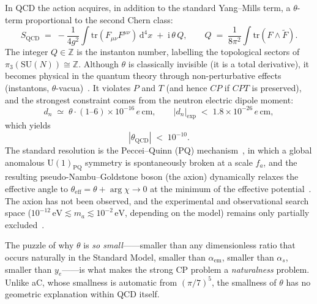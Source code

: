 \documentclass[11pt,a4paper]{article}
\newcommand{\aC}{a\text{-}C}
\newcommand{\SU}{\mathrm{SU}}
\providecommand{\dd}{}
\renewcommand{\dd}{\mathrm{d}}
\providecommand{\ii}{}
\renewcommand{\ii}{\mathrm{i}}
\renewcommand{\tr}{\mathrm{tr}}
\theoremstyle{plain}
\theoremstyle{definition}
\theoremstyle{remark}
\begin{document}
In QCD the action acquires, in addition to the standard Yang--Mills term,
a $\theta$-term proportional to the second Chern class:
\begin{equation}
  S_{\mathrm{QCD}} \;=\; -\frac{1}{4g^2}\int\tr(F_{\mu\nu}F^{\mu\nu})\,\dd^4 x
  \;+\; \ii\,\theta\,Q, \qquad
  Q \;=\; \frac{1}{8\pi^2}\int\tr(F\wedge\tilde F).
\end{equation}
The integer $Q\in\mathbb{Z}$ is the instanton number, labelling the
topological sectors of $\pi_3(\SU(N))\cong\mathbb{Z}$.  Although
$\theta$ is classically invisible (it is a total derivative), it becomes
physical in the quantum theory through non-perturbative effects
(instantons, $\theta$-vacua)~\cite{callan1976vacuum, jackiw1976vacuum}.
It violates $P$ and $T$ (and hence $CP$ if $CPT$ is preserved), and the
strongest constraint comes from the neutron electric dipole moment:
\begin{equation}
  d_n \;\simeq\; \theta\cdot (1\text{--}6)\times 10^{-16}\,e\,\mathrm{cm},
  \qquad
  |d_n|_{\mathrm{exp}} \;<\; 1.8\times 10^{-26}\,e\,\mathrm{cm},
\end{equation}
which yields~\cite{abel2020nEDM}
\begin{equation}\label{eq:theta-bound-exp}
  |\theta_{\mathrm{QCD}}| \;<\; 10^{-10}.
\end{equation}
The standard resolution is the Peccei--Quinn (PQ) mechanism~\cite{pecceiquinn1977},
in which a global anomalous $\mathrm{U}(1)_{\mathrm{PQ}}$ symmetry is
spontaneously broken at a scale $f_a$, and the resulting
pseudo-Nambu--Goldstone boson (the axion) dynamically relaxes the
effective angle to $\theta_{\mathrm{eff}} = \theta + \arg\chi \to 0$ at
the minimum of the effective potential~\cite{weinberg1978, wilczek1978}.
The axion has not been observed, and the experimental and observational
search space ($10^{-12}\,\mathrm{eV} \lesssim m_a \lesssim 10^{-2}\,\mathrm{eV}$,
depending on the model) remains only partially excluded~\cite{irastorza2018axion,
  adams2022axion}.

The puzzle of why $\theta$ is \emph{so small}——smaller than any
dimensionless ratio that occurs naturally in the Standard Model, smaller
than $\alpha_{\mathrm{em}}$, smaller than $\alpha_s$, smaller than
$y_e$——is what makes the strong CP problem a \emph{naturalness} problem.
Unlike \aC{}, whose smallness is automatic from $(\pi/7)^5$, the
smallness of $\theta$ has no geometric explanation within QCD itself.

\end{document}
